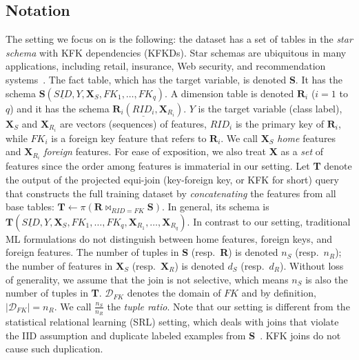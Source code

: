 \documentclass{vldb}
\begin{document}
\subsection{Notation}
The setting we focus on is the following: the dataset has a set of tables in the \textit{star schema} with KFK dependencies (KFKDs).
Star schemas are ubiquitous in many applications, including retail, insurance, Web security, and recommendation systems~\cite{cowbook,hamlet,orion}.
The fact table, which has the target variable, is denoted \textbf{S}. It has the schema $\textbf{S}(\underline{SID},Y, \textbf{X}_S, FK_1, \dots, FK_q)$.
A dimension table is denoted $\textbf{R}_i$ ($i = 1$ to $q$) and it has the schema $\textbf{R}_i(\underline{RID_i},\textbf{X}_{R_i})$.
$Y$ is the target variable (class label), $\textbf{X}_S$ and $\textbf{X}_{R_i}$ are vectors (sequences) of features, $RID_i$ is the primary key
of $\textbf{R}_i$, while $FK_i$ is a foreign key feature that refers to $\textbf{R}_i$. 
We call $\textbf{X}_S$ \textit{home} features and $\textbf{X}_{R_i}$ \textit{foreign} features.
For ease of exposition, we also treat \textbf{X} as a \textit{set} of features since the order among features is immaterial in our setting.
Let \textbf{T} denote the output of the projected equi-join (key-foreign key, or KFK for short) query that constructs the full training dataset by 
\textit{concatenating} the features from all base tables: $\textbf{T} \leftarrow \pi(\textbf{R} \bowtie_{RID=FK} \textbf{S})$. In general, its schema is 
$\textbf{T}(\underline{SID},Y,\textbf{X}_S,FK_1,\dots,FK_q,\textbf{X}_{R_1},\dots,\textbf{X}_{R_q})$. In contrast to our setting, traditional ML 
formulations do not distinguish between home features, foreign keys, and foreign features. The number of tuples in \textbf{S} (resp.~\textbf{R}) is 
denoted $n_S$ (resp.~$n_R$); the number of features in $\textbf{X}_S$ (resp.~$\textbf{X}_R$) is denoted $d_S$ (resp.~$d_R$). Without loss of generality, we
assume that the join is not selective, which means $n_S$ is also the number of tuples in \textbf{T}. $\mathcal{D}_{FK}$ denotes the domain of $FK$ 
and by definition, $|\mathcal{D}_{FK}| = n_R$. We call $\frac{n_S}{n_R}$ the \textit{tuple ratio}.
Note that our setting is different from the statistical relational learning (SRL) setting, which deals with joins that violate the IID 
assumption and duplicate labeled examples from \textbf{S}~\cite{srlbook}. KFK joins do not cause such duplication.
\end{document}

